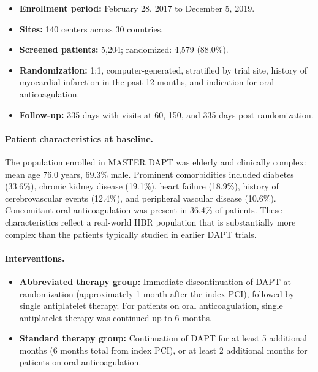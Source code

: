 \begin{itemize}
  \item \textbf{Enrollment period:} February 28, 2017 to December 5, 2019.
  \item \textbf{Sites:} 140 centers across 30 countries.
  \item \textbf{Screened patients:} 5,204; randomized: 4,579 (88.0\%).
  \item \textbf{Randomization:} 1:1, computer-generated, stratified by trial
    site, history of myocardial infarction in the past 12 months, and
    indication for oral anticoagulation.
  \item \textbf{Follow-up:} 335 days with visits at 60, 150, and 335 days
    post-randomization.
\end{itemize}

\paragraph{Patient characteristics at baseline.}
The population enrolled in MASTER DAPT was elderly and clinically complex:
mean age $76.0$ years, 69.3\% male. Prominent comorbidities included
diabetes (33.6\%), chronic kidney disease (19.1\%), heart failure (18.9\%),
history of cerebrovascular events (12.4\%), and peripheral vascular disease
(10.6\%). Concomitant oral anticoagulation was present in 36.4\% of patients.
These characteristics reflect a real-world HBR population that is
substantially more complex than the patients typically studied in earlier
DAPT trials.

\paragraph{Interventions.}
\begin{itemize}
  \item \textbf{Abbreviated therapy group:} Immediate discontinuation of
    DAPT at randomization (approximately 1 month after the index PCI),
    followed by single antiplatelet therapy. For patients on oral
    anticoagulation, single antiplatelet therapy was continued up to 6 months.
  \item \textbf{Standard therapy group:} Continuation of DAPT for at least
    5 additional months (6 months total from index PCI), or at least 2
    additional months for patients on oral anticoagulation.
\end{itemize}

